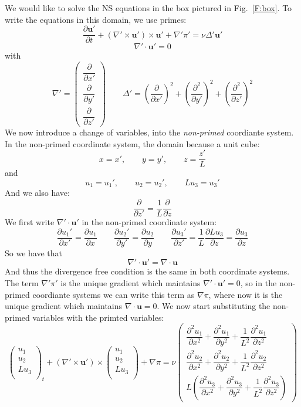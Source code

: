 \documentclass[12pt]{article}
\newcommand{\uv}{\mathbf u}
\newcommand{\up}{\mathbf u'}
\newcommand{\grad}{\nabla}
\newcommand{\curlp}{\gradp \times}
\newcommand{\gradp}{\nabla'}
\begin{document}
We would like to solve the NS equations in the box pictured in
Fig.~\ref{F:box}.  To write the equations in this domain, we use
primes:
\[
\frac{ \partial  \up }{\partial t}  + (\curlp \up) \times \up + \gradp \pi' = \nu \Delta' \up
\]
\[
\gradp \cdot \up = 0
\]
with
\[
\gradp = 
\begin{pmatrix} \dfrac{\partial}{\partial x'} \\[5mm]
                \dfrac{\partial}{\partial y'} \\[5mm]
                \dfrac{\partial}{\partial z'} 
\end{pmatrix}
 \qquad
\Delta'  = \left(\frac{\partial}{\partial x'}\right)^2 + 
           \left(\frac{\partial^2}{\partial y'}\right)^2 +
           \left(\frac{\partial^2}{\partial z'}\right)^2 
\]
We now introduce a change of variables, into the {\em non-primed} coordiante
system.  In the non-primed coordinate system, the domain because a 
unit cube:
\[
x = x', \qquad y=y', \qquad  z = \frac{z'}{L}
\]
and
\[
u_1 = u_1', \qquad u_2 = u_2', \qquad  L u_3 = u_3'
\]
And we also have:
\[
\frac{\partial}{\partial z'} = \frac{1}{L} \frac{\partial}{\partial z}
\]
We first write $\gradp \cdot \up$ in the non-primed coordinate system:
\[
\frac{\partial u_1' }{\partial x'} = \frac{\partial u_1 }{\partial x}
\qquad
\frac{\partial u_2' }{\partial y'} = \frac{\partial u_2 }{\partial y}
\qquad
\frac{\partial u_3' }{\partial z'} = \frac{1}{L} \frac{\partial L u_3 }{\partial z}
= \frac{\partial u_3 }{\partial z}
\]
So we have that
\[
\gradp \cdot \up = \grad \cdot \uv
\]
And thus the divergence free condition is the 
same in both coordinate systems.  The term $\gradp \pi'$ is the
unique gradient which maintains $\gradp \cdot \up = 0$, so in the
non-primed coordiante systems we can write this term as 
$\grad \pi$, where now it is the unique gradient which maintains 
$\grad \cdot \uv = 0$.
We now start substituting the non-primed variables with the
primted variables:
\[
\begin{pmatrix} u_1 \\
                u_2 \\
                L u_3 \\
\end{pmatrix}_t
  + (\curlp \up) \times 
\begin{pmatrix} u_1 \\
                u_2 \\
                L u_3 \\
\end{pmatrix}
+ \grad \pi = \nu 
\begin{pmatrix} \dfrac{\partial^2 u_1}{\partial x^2} + 
                \dfrac{\partial^2 u_1}{\partial y^2} + 
                \dfrac{1}{L^2}\dfrac{\partial^2 u_1}{\partial z^2}   \\[5mm]
                \dfrac{\partial^2 u_2}{\partial x^2} + 
                \dfrac{\partial^2 u_2}{\partial y^2} + 
                \dfrac{1}{L^2}\dfrac{\partial^2 u_2}{\partial z^2}   \\[5mm]
                L \left( 
                \dfrac{\partial^2 u_3}{\partial x^2} + 
                \dfrac{\partial^2 u_3}{\partial y^2} + 
                \dfrac{1}{L^2}\dfrac{\partial^2 u_3}{\partial z^2} \right)
\end{pmatrix}
\]
\end{document}
